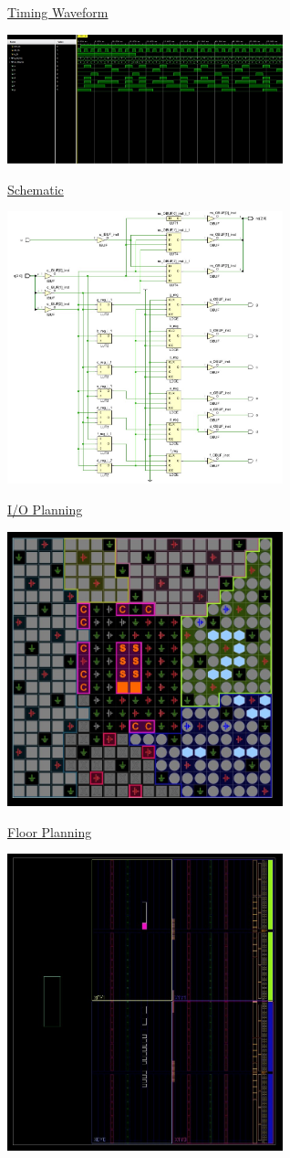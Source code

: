 \documentclass[11pt]{article}
\begin{document}
\begin{center}
    \underline{Timing Waveform}

    \includegraphics[width = 0.6\textwidth]{timingdiag.jpg}

    \underline{Schematic}

    \includegraphics[width = 0.6\textwidth]{schematic.jpg}

    \newpage

    \underline{I/O Planning}

    \includegraphics[width = 0.6\textwidth]{ioplanning.jpg}

    \underline{Floor Planning}

    \includegraphics[width = 0.6\textwidth]{floorplanning.jpg}


\end{center}
\end{document}

